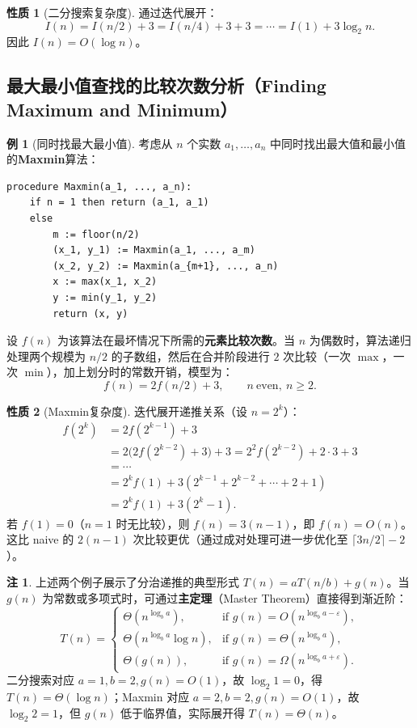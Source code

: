 \documentclass[UTF8,11pt,a4paper]{ctexbook}   %
\theoremstyle{definition}
\newtheorem{example}{例}[section]
\newtheorem{property}{性质}[section]
\newtheorem{remark}{注}[section]
\begin{document}
\begin{property}[二分搜索复杂度]
通过迭代展开：
\[
I(n) = I(n/2) + 3 = I(n/4) + 3 + 3 = \cdots = I(1) + 3\log_2 n.
\]
因此 $I(n) = O(\log n)$。
\end{property}

\subsection{最大最小值查找的比较次数分析（Finding Maximum and Minimum）}

\begin{example}[同时找最大最小值]
考虑从 $n$ 个实数 $a_1,\dots,a_n$ 中同时找出最大值和最小值的\textbf{Maxmin}算法：

\begin{verbatim}
procedure Maxmin(a_1, ..., a_n):
    if n = 1 then return (a_1, a_1)
    else
        m := floor(n/2)
        (x_1, y_1) := Maxmin(a_1, ..., a_m)
        (x_2, y_2) := Maxmin(a_{m+1}, ..., a_n)
        x := max(x_1, x_2)
        y := min(y_1, y_2)
        return (x, y)
\end{verbatim}

设 $f(n)$ 为该算法在最坏情况下所需的\textbf{元素比较次数}。当 $n$ 为偶数时，算法递归处理两个规模为 $n/2$ 的子数组，然后在合并阶段进行 $2$ 次比较（一次 $\max$，一次 $\min$），加上划分时的常数开销，模型为：
\[
f(n) = 2f(n/2) + 3,\qquad n\ \text{even},\ n\ge 2.
\]
\end{example}

\begin{property}[Maxmin复杂度]
迭代展开递推关系（设 $n=2^k$）：
\begin{align*}
f(2^k) &= 2f(2^{k-1}) + 3\\
&= 2\bigl(2f(2^{k-2}) + 3\bigr) + 3 = 2^2 f(2^{k-2}) + 2\cdot 3 + 3\\
&= \cdots\\
&= 2^k f(1) + 3(2^{k-1} + 2^{k-2} + \cdots + 2 + 1)\\
&= 2^k f(1) + 3(2^k - 1).
\end{align*}
若 $f(1)=0$（$n=1$ 时无比较），则 $f(n) = 3(n-1)$，即 $f(n) = O(n)$。这比 naive 的 $2(n-1)$ 次比较更优（通过成对处理可进一步优化至 $\lceil 3n/2 \rceil - 2$）。
\end{property}

\begin{remark}
上述两个例子展示了分治递推的典型形式 $T(n) = aT(n/b) + g(n)$。当 $g(n)$ 为常数或多项式时，可通过\textbf{主定理}（Master Theorem）直接得到渐近阶：
\[
T(n) = \begin{cases}
\Theta(n^{\log_b a}), & \text{if } g(n) = O(n^{\log_b a - \varepsilon}),\\[0.3em]
\Theta(n^{\log_b a}\log n), & \text{if } g(n) = \Theta(n^{\log_b a}),\\[0.3em]
\Theta(g(n)), & \text{if } g(n) = \Omega(n^{\log_b a + \varepsilon}).
\end{cases}
\]
二分搜索对应 $a=1,b=2,g(n)=O(1)$，故 $\log_2 1 = 0$，得 $T(n)=\Theta(\log n)$；Maxmin 对应 $a=2,b=2,g(n)=O(1)$，故 $\log_2 2 = 1$，但 $g(n)$ 低于临界值，实际展开得 $T(n)=\Theta(n)$。
\end{remark}
\end{document}
